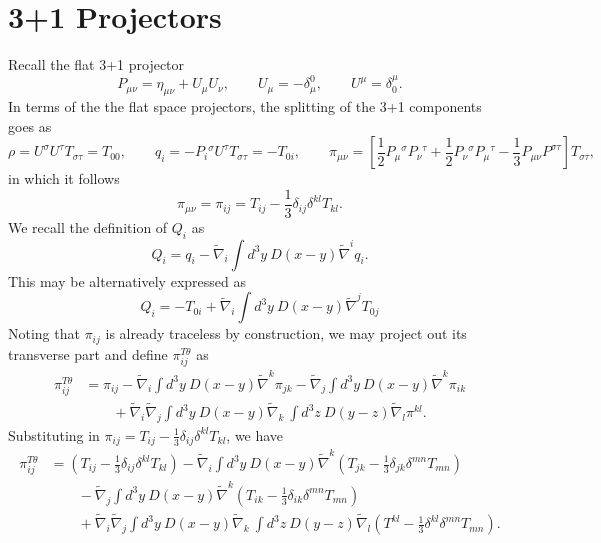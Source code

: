 \documentclass[10pt,letterpaper]{article}
\numberwithin{equation}{section}
\begin{document}
\section{3+1 Projectors}
Recall the flat 3+1 projector
\begin{equation}
P_{\mu\nu} = \eta_{\mu\nu}+U_{\mu}U_{\nu},\qquad U_{\mu} = -\delta^0_\mu,\qquad U^\mu = \delta^\mu_0.
\end{equation}
In terms of the the flat space projectors, the splitting of the 3+1 components goes as
\begin{equation}
\rho = U^\sigma U^\tau T_{\sigma\tau} = T_{00} ,\qquad q_{i} = -P_i{}^\sigma U^\tau T_{\sigma\tau} = -T_{0i},\qquad
\pi_{\mu\nu} = \left[ \frac12 P_\mu{}^\sigma P_\nu{}^\tau + \frac12 P_\nu{}^\sigma P_\mu{}^\tau - \frac13 P_{\mu\nu}P^{\sigma\tau}\right]T_{\sigma\tau},
\end{equation}
in which it follows 
\begin{equation}
\pi_{\mu\nu} = \pi_{ij} = T_{ij} -\frac13 \delta_{ij} \delta^{kl}T_{kl}.
\end{equation}
We recall the definition of $Q_i$ as
\begin{equation}
Q_i = q_i - \tilde\nabla_i \int d^3y\ D(x-y)\tilde\nabla^i q_i.
\end{equation}
This may be alternatively expressed as
\begin{equation}
Q_i = -T_{0i} + \tilde\nabla_i \int d^3y\ D(x-y)\tilde\nabla^j T_{0j}
\end{equation}
Noting that $\pi_{ij}$ is already traceless by construction, we may project out its transverse part and define $\pi^{T\theta}_{ij}$ as
\begin{align}
\pi_{ij}^{T\theta} &= \pi_{ij} - \tilde\nabla_i \int d^3y\ D(x-y) \tilde\nabla^k \pi_{jk} - \tilde\nabla_j \int d^3y\ D(x-y) \tilde\nabla^k \pi_{ik}
\nonumber\\
&\qquad
+\tilde\nabla_i\tilde\nabla_j \int d^3y\ D(x-y) \tilde\nabla_k\ \int d^3z\ D(y-z) \tilde\nabla_l \pi^{kl}.
\end{align}
Substituting in $\pi_{ij} = T_{ij} -\frac13 \delta_{ij} \delta^{kl}T_{kl}$, we have
\begin{align}
\pi_{ij}^{T\theta} &=\left(T_{ij} -\frac13 \delta_{ij} \delta^{kl}T_{kl}\right) - \tilde\nabla_i \int d^3y\ D(x-y) \tilde\nabla^k \left(T_{jk} -\frac13 \delta_{jk} \delta^{mn}T_{mn}\right)
\nonumber\\
&\qquad
 - \tilde\nabla_j \int d^3y\ D(x-y) \tilde\nabla^k \left(T_{ik} -\frac13 \delta_{ik} \delta^{mn}T_{mn}\right)
\nonumber\\
&\qquad
+\tilde\nabla_i\tilde\nabla_j \int d^3y\ D(x-y) \tilde\nabla_k\ \int d^3z\ D(y-z) \tilde\nabla_l \left(T^{kl} -\frac13 \delta^{kl} \delta^{mn}T_{mn}\right).
\end{align}
\end{document}

